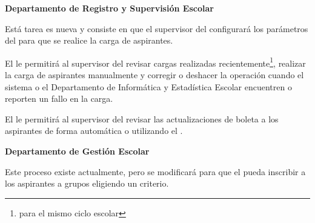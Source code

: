 \begin{PDescripcion}
	\Ppaso \textbf{Departamento de Registro y Supervisión Escolar}
	
	\begin{enumerate}
	
		\Ppaso[\PSubProceso]  Está tarea es nueva y consiste en que el supervisor del  configurará los parámetros del  para que se realice la carga de aspirantes.
		
		\Ppaso [\PSubProceso]  El  le permitirá al supervisor del  revisar cargas realizadas recientemente\footnote{para el mismo ciclo escolar}, realizar la carga de aspirantes manualmente y corregir o deshacer la operación cuando el sistema o el Departamento de Informática y Estadística Escolar encuentren o reporten un fallo en la carga.
		
		\Ppaso [\PSubProceso]  El  le permitirá al supervisor del  revisar las actualizaciones de boleta a los aspirantes de forma automática o utilizando el .
	\end{enumerate}

	\Ppaso \textbf{Departamento de Gestión Escolar}
	\begin{enumerate}
		\Ppaso [\PSubProceso] Este proceso existe actualmente, pero se modificará para que el  pueda inscribir a los aspirantes a grupos eligiendo un criterio.
	\end{enumerate}
	
\end{PDescripcion}






